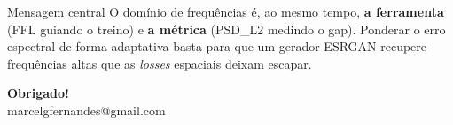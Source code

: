 \documentclass[aspectratio=169]{beamer}
\begin{document}
\begin{frame}[plain]
  \begin{block}{Mensagem central}
    O domínio de frequências é, ao mesmo tempo, \textbf{a ferramenta} (FFL guiando o
    treino) e \textbf{a métrica} (PSD\_L2 medindo o gap). Ponderar o erro espectral
    de forma adaptativa basta para que um gerador ESRGAN recupere frequências altas
    que as \textit{losses} espaciais deixam escapar.
  \end{block}
  \vspace{3em}
  \begin{center}
    \Large\textbf{Obrigado!}\\[0.6em]
    \normalsize marcelgfernandes@gmail.com
  \end{center}
\end{frame}

\end{document}

